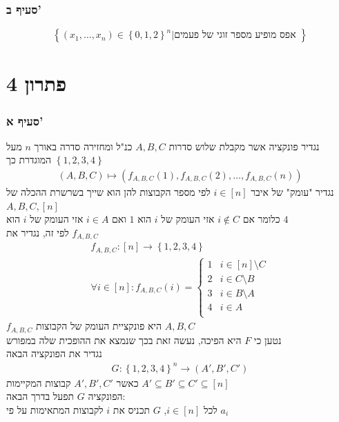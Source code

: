 \documentclass[12pt, titlepage]{article}
\begin{document}
\section*{סעיף ב'}
\[
    \left\{\left(x_1,\ldots,x_n\right)\in\left\{0,1,2\right\}^{n}|\text{אפס מופיע מספר זוגי של פעמים }\right\}
\]
\part*{פתרון 4}
\section*{סעיף א'}
נגדיר פונקציה אשר מקבלת שלוש סדרות $A,B,C$ כנ"ל ומחזירה סדרה באורך $n$ מעל $\left\{1,2,3,4\right\}$ המוגדרת כך
\begin{gather*}
    \left(A,B,C\right) \mapsto \left(f_{A,B,C}\left(1\right),f_{A,B,C}\left(2\right),\ldots,f_{A,B,C}\left(n\right)\right)
\end{gather*}
נגדיר "עומק" של איבר $i\in\left[n\right]$ לפי מספר הקבוצות להן הוא שייך בשרשרת ההכלה של $A,B,C,\left[n\right]$\\
כלומר אם $i\notin C$ אזי העומק של $i$ הוא $1$ ואם $i\in A$ אזי העומק של $i$ הוא $4$\\
לפי זה, נגדיר את $f_{A,B,C}$
\begin{gather*}
    f_{A,B,C}:\left[n\right] \to \left\{1,2,3,4\right\} \\
    \forall i \in \left[n\right]: f_{A,B,C}\left(i\right) = \begin{cases}
        1 & i\in \left[n\right]\setminus C \\
        2 & i \in C \setminus B\\
        3 & i \in B \setminus A\\
        4 & i \in A\\
    \end{cases}
\end{gather*}
$f_{A,B,C}$ היא פונקציית העומק של הקבוצות $A,B,C$\\
נטען כי $F$ היא הפיכה, נעשה זאת בכך שנמצא את ההופכית שלה במפורש\\
נגדיר את הפונקציה הבאה
\begin{gather*}
    G: \left\{1,2,3,4\right\}^n \to \left(A',B',C'\right)
\end{gather*}
כאשר $A',B',C'$ קבוצות המקיימות $A' \subseteq B' \subseteq C' \subseteq \left[n\right]$\\
הפונקציה $G$ תפעל בדרך הבאה:\\
לכל $i\in \left[n\right]$, $G$ תכניס את $i$ לקבוצות המתאימות על פי $a_i$
\end{document}
